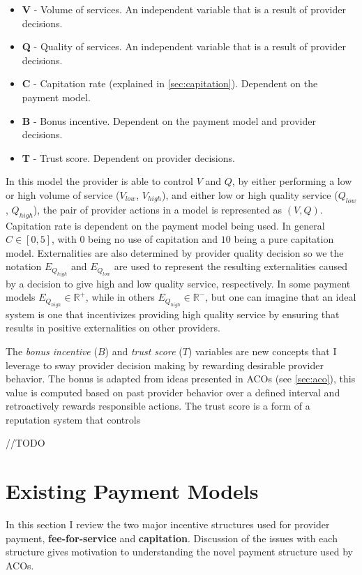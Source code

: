 \documentclass{article}
\begin{document}
\begin{itemize}
    \item \textbf{V} - Volume of services. An independent variable that is a result of provider decisions.
    \item \textbf{Q} - Quality of services. An independent variable that is a result of provider decisions.
    \item \textbf{C} - Capitation rate (explained in \ref{sec:capitation}). Dependent on the payment model.
    \item \textbf{B} - Bonus incentive. Dependent on the payment model and provider decisions.
    \item \textbf{T} - Trust score. Dependent on provider decisions.
\end{itemize}

In this model the provider is able to control $V$ and $Q$, by either performing a low or high volume of service ($V_{low}$, $V_{high}$), and either low or high quality service ($Q_{low}$, $Q_{high}$), the pair of provider actions in a model is represented as $(V, Q)$. Capitation rate is dependent on the payment model being used. In general $C \in [0, 5]$, with $0$ being no use of capitation and $10$ being a pure capitation model. Externalities are also determined by provider quality decision so we the notation $E_{Q_{high}}$ and $E_{Q_{low}}$ are used to represent the resulting externalities caused by a decision to give high and low quality service, respectively. In some payment models $E_{Q_{high}} \in \mathbb{R}^+$, while in others $E_{Q_{high}} \in \mathbb{R}^-$, but one can imagine that an ideal system is one that incentivizes providing high quality service by ensuring that results in positive externalities on other providers.

The \emph{bonus incentive} ($B$) and \emph{trust score} ($T$) variables are new concepts that I leverage to sway provider decision making by rewarding desirable provider behavior. The bonus is adapted from ideas presented in ACOs (see \ref{sec:aco}), this value is computed based on past provider behavior over a defined interval and retroactively rewards responsible actions. The trust score is a form of a reputation system \cite{tim} that controls 

//TODO

\section{Existing Payment Models}
In this section I review the two major incentive structures used for provider payment, \textbf{fee-for-service} and \textbf{capitation}. Discussion of the issues with each structure gives motivation to understanding the novel payment structure used by ACOs.
\end{document}
